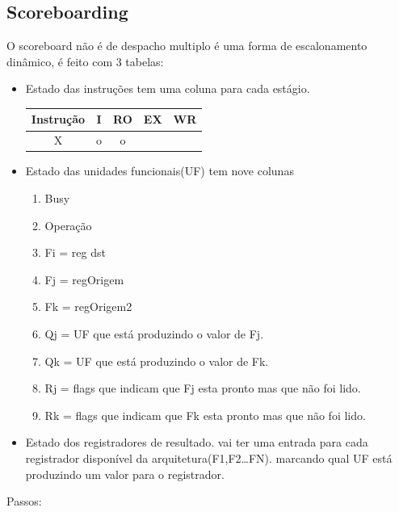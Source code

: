 \documentclass[a4paper]{article}
\begin{document}
\subsection{Scoreboarding}
O scoreboard não é de despacho multiplo é uma forma de escalonamento dinâmico,
é feito com 3 tabelas:
\begin{itemize}
    \item Estado das instruções tem uma coluna para cada estágio.
        \begin{table}[h]
            \begin{center}
                \begin{tabular}{||c|c|c|c|c||}
                    \hline
                    Instrução&I&RO&EX&WR\\
                    \hline
                    X& o &o&&\\
                    \hline
                \end{tabular}
            \end{center}
        \end{table}
    \item Estado das unidades funcionais(UF) tem nove colunas
        \begin{enumerate}
            \item Busy
            \item Operação
            \item Fi = reg dst
            \item Fj = regOrigem
            \item Fk = regOrigem2
            \item Qj = UF que está produzindo o valor de Fj.
            \item Qk = UF que está produzindo o valor de Fk.
            \item Rj = flags que indicam que Fj esta pronto mas que não foi lido.
            \item Rk = flags que indicam que Fk esta pronto mas que não foi lido.
        \end{enumerate}
    \item Estado dos registradores de resultado. vai ter uma entrada para cada registrador disponível da
        arquitetura(F1,F2\ldots FN). marcando qual UF está produzindo um valor para o registrador.
\end{itemize}
Passos:
\end{document}
